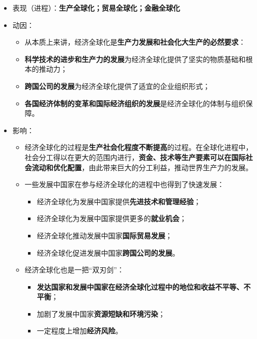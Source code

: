 \documentclass[
]{article}
\begin{document}
\begin{itemize}
\item
  表现（进程）：\textbf{生产全球化；贸易全球化；金融全球化}
\item
  动因：

  \begin{itemize}
  \item
    从本质上来讲，经济全球化是\textbf{生产力发展和社会化大生产的必然要求}：
  \item
    \textbf{科学技术的进步和生产力的发展}为经济全球化提供了坚实的物质基础和根本的推动力；
  \item
    \textbf{跨国公司的发展}为经济全球化提供了适宜的企业组织形式；
  \item
    \textbf{各国经济体制的变革和国际经济组织的发展}是经济全球化的体制与组织保障。
  \end{itemize}
\item
  影响：

  \begin{itemize}
  \item
    经济全球化的过程是\textbf{生产社会化程度不断提高}的过程。在全球化进程中，社会分工得以在更大的范围内进行，\textbf{资金、技术等生产要素可以在国际社会流动和优化配置}，由此带来巨大的分工利益，推动世界生产力的发展。
  \item
    一些发展中国家在参与经济全球化的进程中也得到了快速发展：

    \begin{itemize}
    \item
      经济全球化为发展中国家提供\textbf{先进技术和管理经验}；
    \item
      经济全球化为发展中国家提供更多的\textbf{就业机会}；
    \item
      经济全球化推动发展中国家\textbf{国际贸易发展}；
    \item
      经济全球化促进发展中国家\textbf{跨国公司的发展}。
    \end{itemize}
  \item
    经济全球化也是一把``双刃剑''：

    \begin{itemize}
    \item
      \textbf{发达国家和发展中国家在经济全球化过程中的地位和收益不平等、不平衡}；
    \item
      加剧了发展中国家\textbf{资源短缺和环境污染}；
    \item
      一定程度上增加\textbf{经济风险}。
    \end{itemize}
  \end{itemize}
\end{itemize}
\end{document}
